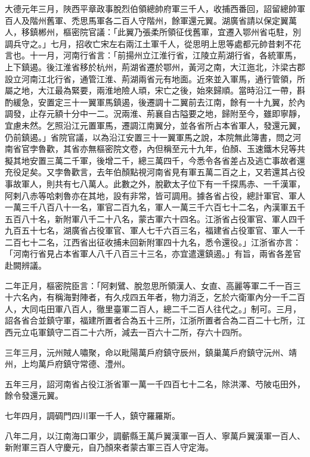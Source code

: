 \begin{pinyinscope}
 大德元年三月，陜西平章政事脫烈伯領總帥府軍三千人，收捕西番回，詔留總帥軍百人及階州舊軍、禿思馬軍各二百人守階州，餘軍還元翼。湖廣省請以保定翼萬人，移鎮郴州，樞密院官議：「此翼乃張柔所領征伐舊軍，宜遷入鄂州省屯駐，別調兵守之。」七月，招收亡宋左右兩江土軍千人，從思明上思等處都元帥昔剌不花言也。十一月，河南行省言：「前揚州立江淮行省，江陵立荊湖行省，各統軍馬，上下鎮遏。後江淮省移於杭州，荊湖省遷於鄂州，黃河之南，大江迤北，汴梁古郡設立河南江北行省，通管江淮、荊湖兩省元有地面。近來並入軍馬，通行管領，所屬之地，大江最為緊要，兩淮地險人頑，宋亡之後，始來歸順。當時沿江一帶，斟酌緩急，安置定三十一翼軍馬鎮遏，後遷調十二翼前去江南，餘有一十九翼，於內調發，止存元額十分中一二。況兩淮、荊襄自古隘要之地，歸附至今，雖即寧靜，宜慮未然。乞照沿江元置軍馬，遷調江南翼分，並各省所占本省軍人，發還元翼，仍前鎮遏。」省院官議，以為沿江安置三十一翼軍馬之說，本院無此簿書，問之河南省官孛魯歡，其省亦無樞密院文卷，內但稱至元十九年，伯顏、玉速鐵木兒等共擬其地安置三萬二千軍，後增二千，總三萬四千，今悉令各省差占及逃亡事故者還充役足矣。又孛魯歡言，去年伯顏點視河南省見有軍五萬二百之上，又若還其占役事故軍人，則共有七八萬人。此數之外，脫歡太子位下有一千探馬赤、一千漢軍，阿剌八赤等哈剌魯亦在其地，設有非常，皆可調用。據各省占役，總計軍官、軍人一萬三千八百八十一名，軍官二百九名，軍人一萬三千六百七十二名，內漢軍五千五百八十名，新附軍八千二十八名，蒙古軍六十四名。江浙省占役軍官、軍人四千九百五十七名，湖廣省占役軍官、軍人七千六百三名，福建省占役軍官、軍人一千二百七十二名，江西省出征收捕未回新附軍四十九名，悉令還役。」江浙省亦言：「河南行省見占本省軍人八千八百三十三名，亦宜遣還鎮遏。」有旨，兩省各差官赴闕辨議。



 二年正月，樞密院臣言：「阿剌鷿、脫忽思所領漢人、女直、高麗等軍二千一百三十六名內，有稱海對陣者，有久戍四五年者，物力消乏，乞於六衛軍內分一千二百人，大同屯田軍八百人，徹里臺軍二百人，總二千二百人往代之。」制可。三月，詔各省合並鎮守軍，福建所置者合為五十三所，江浙所置者合為二百二十七所，江西元立屯軍鎮守二百二十六所，減去一百六十二所，存六十四所。



 三年三月，沅州賊人嘯聚，命以毗陽萬戶府鎮守辰州，鎮巢萬戶府鎮守沅州、靖州，上均萬戶府鎮守常德、澧州。



 五年三月，詔河南省占役江浙省軍一萬一千四百七十二名，除洪澤、芍陂屯田外，餘令發還元翼。



 七年四月，調碉門四川軍一千人，鎮守羅羅斯。



 八年二月，以江南海口軍少，調蘄縣王萬戶翼漢軍一百人、寧萬戶翼漢軍一百人、新附軍三百人守慶元，自乃顏來者蒙古軍三百人守定海。




\end{pinyinscope}
